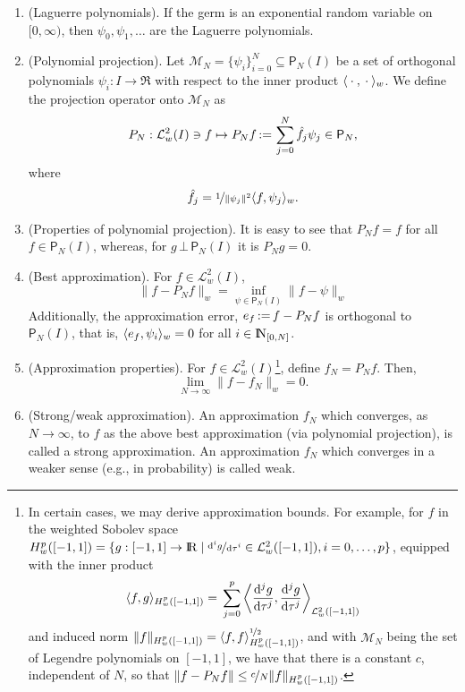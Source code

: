 \documentclass[a4paper,10pt]{article}
\begin{document}
\begin{enumerate}
 \item (Laguerre polynomials). If the germ is an exponential random variable on \([0,\infty)\),
       then \(\psi_0,\psi_1,\ldots\) are the Laguerre polynomials.
       
 \item (Polynomial projection). Let \(\mathcal{M}_N = \{\psi_i\}_{i=0}^{N} \subseteq \mathsf{P}_N(I)\) be a set of orthogonal polynomials
       \(\psi_i:I\to\Re\) with respect to the inner product \(\langle{}\cdot{}, {}\cdot{}\rangle_w\).
       We define the projection operator onto \(\mathcal{M}_N\) as
       \[
        P_N:\mathcal{L}^2_w(I) \ni f \mapsto P_N f {}\mathop{\mathrel{:}=}{} \sum_{j=0}^{N}\hat{f}_j \psi_j \in \mathsf{P}_N,
       \]
       where 
       \[
	 \hat{f}_j = \nicefrac{1}{\|\psi_j\|^2}\langle f, \psi_j\rangle_w.
       \]
 \item (Properties of polynomial projection). It is easy to see that \(P_N f = f\) for all \(f\in\mathsf{P}_N(I)\),
       whereas, for \(g {}{\,}\bot{\,}{} \mathsf{P}_N(I)\) it is \(P_N g = 0\).

 \item (Best approximation). For \(f\in\mathcal{L}^2_w(I)\),        
       \[
        \|f - P_N f \|_{w} = \inf_{\psi\in\mathsf{P}_N(I)}\|f - \psi\|_{w} 
       \]
       Additionally, the approximation error, \(e_f {}\mathop{\mathrel{:}=}{} f - P_Nf\) is orthogonal to \(\mathsf{P}_N(I)\), 
       that is, \(\langle e_f, \psi_i\rangle_w = 0\) for all \(i\in\N_{[0,N]}\).

 \item (Approximation properties). For  \(f\in\mathcal{L}^2_w(I)\)\footnote{In certain cases, we may derive approximation 
       bounds. For example, for \(f\) in the weighted Sobolev space 
	    \(
		H_{w}^p([-1,1])
		{}={}
		\{
		  g: [-1,1]\to\Re 
		  {}\mid{}
		  \nicefrac{\d^i g}{\d \tau^i} \in \mathcal{L}^2_w([-1,1]),
		  i=0,\ldots,p
		\}
	    \),
	    equipped with the inner product 
	    \[
		\langle f,g\rangle_{H_{w}^p([-1,1])} 
		{}={}
		\sum_{j=0}^{p}
		\left\langle
		  \frac{\mathrm{d}^j g}{\mathrm{d} \tau^j},
		  \frac{\mathrm{d}^j g}{\mathrm{d} \tau^j}
		\right\rangle_{\mathcal{L}_w^2([-1,1])}
	    \]
	    and induced norm \(\|f\|_{H_{w}^p([-1,1])} = \langle f,f\rangle_{H_{w}^p([-1,1])}^{\nicefrac{1}{2}}\),
	    and with \(\mathcal{M}_N\) being the set of Legendre polynomials on \([-1,1]\),
	    we have that there is a constant \(c\), independent of \(N\), so that \(\|f-P_Nf\| \leq \nicefrac{c}{N}\|f\|_{H_{w}^p([-1,1])}\).
	    }, define \(f_N = P_N f\). Then,
	\[
	  \lim_{N\to\infty}\|f - f_N\|_{w} = 0.
	\]
 \item (Strong/weak approximation). An approximation \(f_N\) which converges, as \(N\to\infty\), to \(f\) as the 
       above best approximation (via polynomial projection), is called a strong approximation. An approximation
       \(f_N\) which converges in a weaker sense (e.g., in probability) is called weak.
\end{enumerate}
\end{document}
